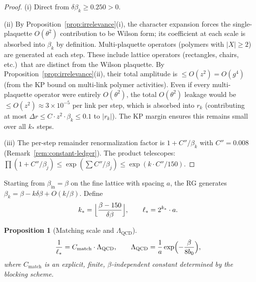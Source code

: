 \documentclass[11pt]{article}
\newtheorem{proposition}[theorem]{Proposition}
\theoremstyle{definition}
\newcommand{\Lam}{\Lambda_{\mathrm{QCD}}}
\begin{document}
\begin{proof}
(i) Direct from $\delta\beta_k\ge 0.250>0$.

(ii) By Proposition~\ref{prop:irrelevance}(i), the character
expansion forces the single-plaquette $O(\theta^2)$ contribution
to be Wilson form; its coefficient at each scale is absorbed
into $\beta_k$ by definition.  Multi-plaquette operators
(polymers with $|X|\ge 2$) are generated at each step.
These include lattice operators (rectangles, chairs, etc.)\
that are distinct from the Wilson plaquette.
By Proposition~\ref{prop:irrelevance}(ii), their total
amplitude is $\le O(z^2)=O(g^4)$ (from the KP bound on
multi-link polymer activities).  Even if every
multi-plaquette operator were entirely $O(\theta^2)$, the
total $O(\theta^2)$ leakage would be
$\le O(z^2)\approx 3\times 10^{-5}$ per link per step,
which is absorbed into $r_k$ (contributing at most
$\Delta r\le C\cdot z^2\cdot\beta_k\le 0.1$ to $|r_k|$).
The KP margin ensures this remains small over all $k_*$ steps.

(iii) The per-step remainder renormalization
factor is $1+C''/\beta_k$ with $C''=0.008$
(Remark~\ref{rem:constant-ledger}).  The product telescopes:
$\prod(1+C''/\beta_j)\le\exp(\sum C''/\beta_j)
\le\exp(k\cdot C''/150)$.
\end{proof}

Starting from $\beta_{\mathrm{in}}=\beta$ on the fine lattice with spacing $a$,
the RG generates $\beta_k=\beta-k\delta\beta+O(k/\beta)$.  Define
\begin{equation}
k_*=\Bigl\lfloor\frac{\beta-150}{\delta\beta}\Bigr\rfloor,
\qquad\ell_*=2^{k_*}\cdot a.
\end{equation}

\begin{proposition}[Matching scale and $\Lam$]\label{prop:matching}
\begin{equation}\label{eq:matching}
\frac{1}{\ell_*}=C_{\mathrm{match}}\cdot\Lam,
\qquad\Lam=\frac{1}{a}\exp\Bigl(-\frac{\beta}{8b_0}\Bigr),
\end{equation}
where $C_{\mathrm{match}}$ is an explicit, finite, $\beta$-independent
constant determined by the blocking scheme.
\end{proposition}
\end{document}
